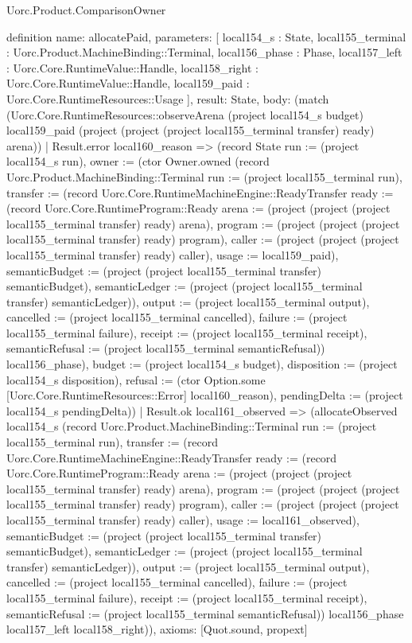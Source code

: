 \begin{lexlean}{Uorc.Product.ComparisonOwner}
\begin{semanticmodule}
definition{
  name: allocatePaid,
  parameters: [
    local154_s : State,
    local155_terminal : Uorc.Product.MachineBinding::Terminal,
    local156_phase : Phase,
    local157_left : Uorc.Core.RuntimeValue::Handle,
    local158_right : Uorc.Core.RuntimeValue::Handle,
    local159_paid : Uorc.Core.RuntimeResources::Usage
  ],
  result: State,
  body: (match (Uorc.Core.RuntimeResources::observeArena (project local154_s budget) local159_paid (project (project (project local155_terminal transfer) ready) arena))
    | Result.error local160_reason => (record State {run := (project local154_s run), owner := (ctor Owner.owned (record Uorc.Product.MachineBinding::Terminal {run := (project local155_terminal run), transfer := (record Uorc.Core.RuntimeMachineEngine::ReadyTransfer {ready := (record Uorc.Core.RuntimeProgram::Ready {arena := (project (project (project local155_terminal transfer) ready) arena), program := (project (project (project local155_terminal transfer) ready) program), caller := (project (project (project local155_terminal transfer) ready) caller), usage := local159_paid}), semanticBudget := (project (project local155_terminal transfer) semanticBudget), semanticLedger := (project (project local155_terminal transfer) semanticLedger)}), output := (project local155_terminal output), cancelled := (project local155_terminal cancelled), failure := (project local155_terminal failure), receipt := (project local155_terminal receipt), semanticRefusal := (project local155_terminal semanticRefusal)}) local156_phase), budget := (project local154_s budget), disposition := (project local154_s disposition), refusal := (ctor Option.some [Uorc.Core.RuntimeResources::Error] local160_reason), pendingDelta := (project local154_s pendingDelta)})
    | Result.ok local161_observed => (allocateObserved local154_s (record Uorc.Product.MachineBinding::Terminal {run := (project local155_terminal run), transfer := (record Uorc.Core.RuntimeMachineEngine::ReadyTransfer {ready := (record Uorc.Core.RuntimeProgram::Ready {arena := (project (project (project local155_terminal transfer) ready) arena), program := (project (project (project local155_terminal transfer) ready) program), caller := (project (project (project local155_terminal transfer) ready) caller), usage := local161_observed}), semanticBudget := (project (project local155_terminal transfer) semanticBudget), semanticLedger := (project (project local155_terminal transfer) semanticLedger)}), output := (project local155_terminal output), cancelled := (project local155_terminal cancelled), failure := (project local155_terminal failure), receipt := (project local155_terminal receipt), semanticRefusal := (project local155_terminal semanticRefusal)}) local156_phase local157_left local158_right)),
  axioms: [Quot.sound, propext]
}


\end{semanticmodule}
\end{lexlean}
